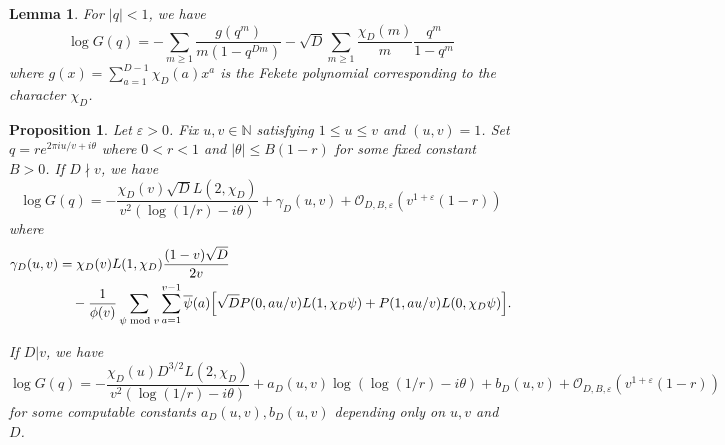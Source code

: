 \documentclass[10pt,a4paper]{amsart}
\newtheorem{lem}{Lemma}
\newtheorem{prop}{Proposition}
\begin{document}
\begin{lem}\label{lem 1} For $|q|<1$, we have 
\begin{equation}\label{log F}
\log G(q)
=
-\sum_{m\geq 1}\frac{g(q^m)}{m(1-q^{Dm})}
-\sqrt{D}\sum_{m\geq 1}\frac{\chi_D(m)}{m}\frac{q^m}{1-q^m}
\end{equation}
where $
g(x)=\sum_{a=1}^{D-1}\chi_D(a)x^a$
is the Fekete polynomial corresponding to the character $\chi_D$.
\end{lem}

\begin{prop}\label{precise lem}
Let $\varepsilon>0$. Fix $u,v \in \mathbb{N}$ satisfying $1 \leq u \leq v$ and $(u,v)=1$. Set $q=re^{2\pi i {u}/{v} +i\theta}$ where $0<r<1$ and $|\theta|\leq B(1-r)$ for some fixed constant $B>0$. If $D\nmid v$, we have 
\begin{equation}\label{log F 2}
\log G(q)
=
-\frac{\chi_D(v)\sqrt{D}L(2,\chi_D)}{v^2(\log(1/r)-i\theta)}
+\gamma_D(u,v)
+\mathcal{O}_{D,B,\varepsilon}(v^{1+\varepsilon}(1-r))
\end{equation}
where 
\begin{align}\label{Eq: Gamma Def}
\gamma_D(u,v)
&=
\chi_D(v) L(1,\chi_D) \frac{(1-v)\sqrt{D}}{2v}
\notag \\
&\quad -
\frac{1}{\phi(v)}\sum_{\psi \bmod v} \sum_{a=1}^{v-1}\overline{\psi}(a)\Big[\sqrt{D}P(0,au/v)L(1,\chi_D\psi)
+
P(1,au/v)L(0,\chi_D\psi)\Big].
\end{align}

If $D|v$, we have 
\begin{equation}\label{log F 3}
\log G(q)
=
-\frac{\chi_D(u)D^{3/2}L(2,\chi_D)}{v^2(\log(1/r)-i\theta)}
+a_D(u,v)\log(\log(1/r)-i\theta)+b_D(u,v)+\mathcal{O}_{D,B,\varepsilon}(v^{1+\varepsilon}(1-r))
\end{equation}
for some computable constants $a_D(u,v),b_D(u,v)$ depending only on $u,v$ and $D$. 
\end{prop}
\end{document}
